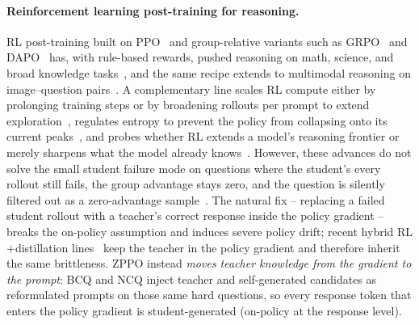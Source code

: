 \paragraph{Reinforcement learning post-training for reasoning.}
RL post-training built on PPO~\citep{schulman2017proximal} and group-relative variants such as GRPO~\citep{shao2024deepseekmath} and DAPO~\citep{yu2025dapo} has, with rule-based rewards, pushed reasoning on math, science, and broad knowledge tasks~\citep{guo2025deepseek,team2025kimi,liu2025understanding,he2025justrl,khatri2025art,liu2025prorl,hu2025brorl,hu2025reinforce++,liu2025dler,liu2026gdpo}, and the same recipe extends to multimodal reasoning on image--question pairs~\citep{chen2025r1v,yang2025r1,deng2025openvlthinker,zhou2025r1,liu2025visual,chen2025sft,zhou2025reinforced}. A complementary line scales RL compute either by prolonging training steps or by broadening rollouts per prompt to extend exploration~\citep{liu2025prorl,hu2025brorl}, regulates entropy to prevent the policy from collapsing onto its current peaks~\citep{cui2025entropy,wang2025arbitrary}, and probes whether RL extends a model's reasoning frontier or merely sharpens what the model already knows~\citep{yue2025does}. However, these advances do not solve the small student failure mode on questions where the student's every rollout still fails, the group advantage stays zero, and the question is silently filtered out as a zero-advantage sample~\citep{yu2025dapo}. The natural fix -- replacing a failed student rollout with a teacher's correct response inside the policy gradient -- breaks the on-policy assumption and induces severe policy drift; recent hybrid RL$+$distillation lines~\citep{xu2025kdrl,xu2026rlkd} keep the teacher in the policy gradient and therefore inherit the same brittleness. ZPPO instead \emph{moves teacher knowledge from the gradient to the prompt}: BCQ and NCQ inject teacher and self-generated candidates as reformulated prompts on those same hard questions, so every response token that enters the policy gradient is student-generated (on-policy at the response level).

